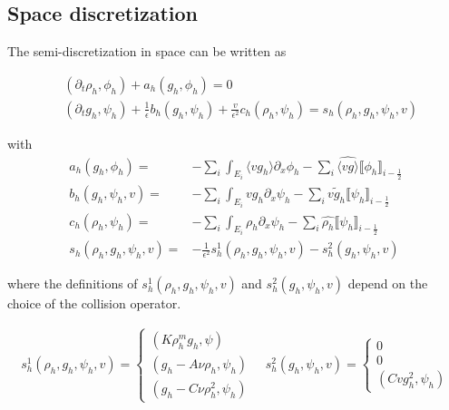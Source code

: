 \documentclass[]{article}
\begin{document}
\subsection{Space discretization}

The semi-discretization in space can be written as

\begin{subequations}
\begin{align}
& (\partial_t \rho_h, \phi_h) + a_h(g_h, \phi_h) = 0\\
& (\partial_t g_h, \psi_h) + \frac{1}{\epsilon}b_h(g_h, \psi_h) + \frac{v}{\epsilon^2}c_h(\rho_h, \psi_h) = s_h(\rho_h, g_h, \psi_h, v)
\end{align}
\end{subequations}

with
\begin{subequations}
\begin{align}
a_h(g_h, \phi_h) = & - \sum_i \int_{E_i} \langle v g_h \rangle \partial_x \phi_h - \sum_{i} \widehat{\langle v g \rangle} \llbracket \phi_h \rrbracket_{i-\frac{1}{2}} \\
b_h(g_h, \psi_h, v) = & - \sum_i \int_{E_i} v g_h \partial_x \psi_h - \sum_i \widetilde{v g_h} \llbracket \psi_h \rrbracket_{i - \frac{1}{2}}\\
c_h(\rho_h, \psi_h) = & - \sum_i \int_{E_i} \rho_h \partial_x \psi_h - \sum_i \widehat{ \rho_h} \llbracket \psi_h \rrbracket_{i - \frac{1}{2}} \\
s_h(\rho_h, g_h, \psi_h, v) = & - \frac{1}{\epsilon^2}s_h^1(\rho_h, g_h, \psi_h, v) - s_h^2(g_h, \psi_h, v)
\end{align}
\end{subequations}

where the definitions of $s_h^1(\rho_h, g_h, \psi_h, v)$ and $s_h^2(g_h, \psi_h, v)$ depend on the choice of the collision operator.

	\begin{align*}
		s_h^1(\rho_h, g_h, \psi_h, v) = \begin{cases}
			(K \rho_h^m g_h, \psi) \\
			(g_h - A \nu \rho_h, \psi_h) \\
			(g_h - C \nu \rho_h^2, \psi_h)
		\end{cases}
		\quad
		s_h^2(g_h, \psi_h, v) = \begin{cases}
			0 \\
			0 \\
			(C v g_h^2, \psi_h)
		\end{cases}
	\end{align*}
\end{document}

